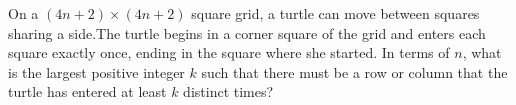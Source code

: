 On a $(4n + 2)\times (4n + 2)$ square grid, a turtle can move between squares sharing a side.The turtle begins in a corner square of the grid and enters each square exactly once, ending in the square where she started. In terms of $n$,  what is the largest positive integer $k$ such that there must be a row or column that the turtle has entered at least $k$ distinct times?